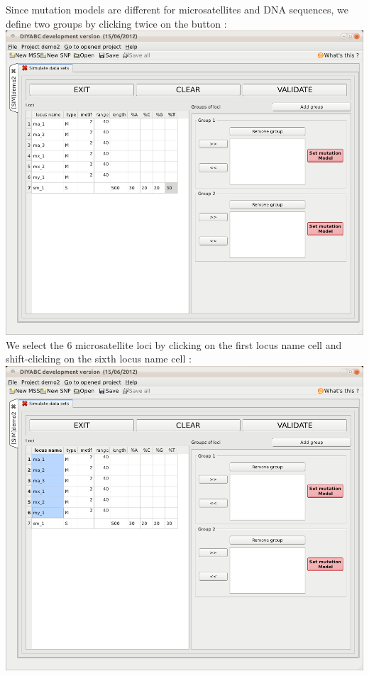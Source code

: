 Since mutation models are different for microsatellites and DNA sequences, we define two groups by clicking twice on the  button :\\

\includegraphics[scale=0.33]{gui_pictures/Capture-DIYABC-75.png} \\

We select the 6 microsatellite loci by clicking on the first locus name cell and shift-clicking on the sixth locus name cell :\\

\includegraphics[scale=0.33]{gui_pictures/Capture-DIYABC-76.png} \\

